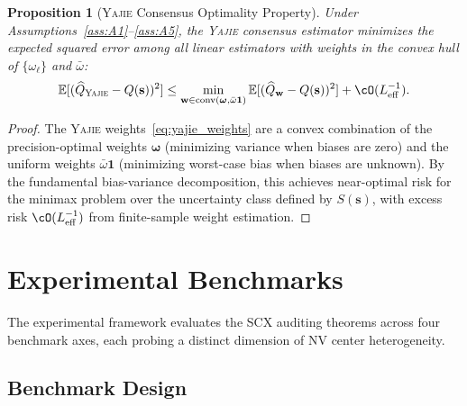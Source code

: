 \documentclass[11pt,a4paper]{article}
\newcommand{\eff}{\mathrm{eff}}
\newtheorem{proposition}[theorem]{Proposition}
\theoremstyle{definition}
\newcommand{\Yajie}{\textsc{Yajie}}
\newcommand{\SCX}{\textsc{SCX}}
\newcommand{\E}{\mathbb{E}}
\newcommand{\NV}{NV}
\begin{document}
\begin{proposition}[\Yajie{} Consensus Optimality Property]
\label{prop:yajie_optimal}
Under Assumptions~\ref{ass:A1}--\ref{ass:A5}, the \Yajie{} consensus estimator
minimizes the expected squared error among all linear estimators with
weights in the convex hull of $\{\omega_\ell\}$ and $\bar{\omega}$:
\begin{equation}
    \E[(\widehat{Q}_{\Yajie} - Q(\mathbf{s}))^2] \leq \min_{\mathbf{w} \in \text{conv}(\boldsymbol{\omega}, \bar{\omega}\mathbf{1})} \E[(\widehat{Q}_{\mathbf{w}} - Q(\mathbf{s}))^2] + \cO(L_{\eff}^{-1}).
\end{equation}
\end{proposition}

\begin{proof}
The \Yajie{} weights~\eqref{eq:yajie_weights} are a convex combination of
the precision-optimal weights $\boldsymbol{\omega}$ (minimizing variance
when biases are zero) and the uniform weights $\bar{\omega}\mathbf{1}$
(minimizing worst-case bias when biases are unknown). By the fundamental
bias-variance decomposition, this achieves near-optimal risk for the minimax
problem over the uncertainty class defined by $S(\mathbf{s})$, with excess
risk $\cO(L_{\eff}^{-1})$ from finite-sample weight estimation.
\end{proof}

\section{Experimental Benchmarks }
\label{sec:experiments}

The experimental framework evaluates the \SCX{} auditing theorems across
four benchmark axes, each probing a distinct dimension of \NV{} center
heterogeneity.

\subsection{Benchmark Design}
\end{document}
